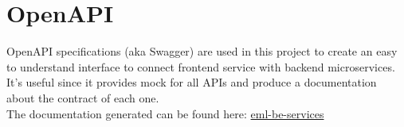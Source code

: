 \section{OpenAPI} \label{_openAPI}
OpenAPI specifications (aka Swagger) are used in this project to create an easy to
understand interface to connect frontend service with
backend microservices.
It's useful since it provides mock for all APIs and produce a documentation about the contract of each one.\\
The documentation generated can be found here: \href{https://swexception.github.io/eml-be-services/}{eml-be-services}
